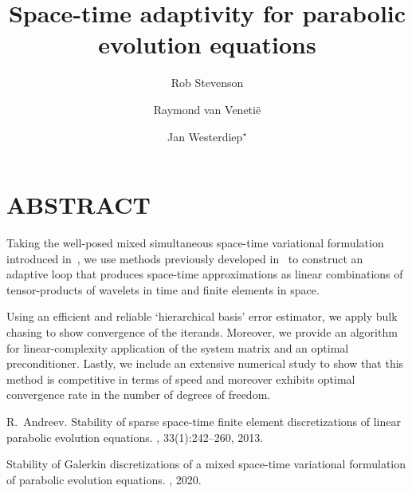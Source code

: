 \documentclass[12pt]{amsart}
\title{Space-time adaptivity for parabolic evolution equations}
\author{Rob Stevenson \and Raymond van Veneti\"e \and Jan Westerdiep$^\star$}
\begin{document}
\maketitle

\section*{ABSTRACT}


Taking the well-posed mixed simultaneous space-time variational formulation
introduced in~\cite{And13}, we use methods previously developed in~\cite{SW20}
to construct an adaptive loop that produces space-time approximations as linear
combinations of tensor-products of wavelets in time and finite elements in space.

Using an efficient and reliable `hierarchical basis' error estimator, we apply bulk
chasing to show convergence of the iterands. Moreover, we provide an algorithm for
linear-complexity application of the system matrix and an optimal preconditioner.
Lastly, we include an extensive numerical study to show that this method is competitive
in terms of speed and moreover exhibits optimal convergence rate in the number of
degrees of freedom.

\begin{thebibliography}{99}

R.~Andreev.
\newblock Stability of sparse space-time finite element discretizations of
 linear parabolic evolution equations.
, 33(1):242--260, 2013.

\newblock Stability of Galerkin discretizations of a mixed space-time variational
   formulation of parabolic evolution equations.
, 2020.

\end{thebibliography}
\end{document}
